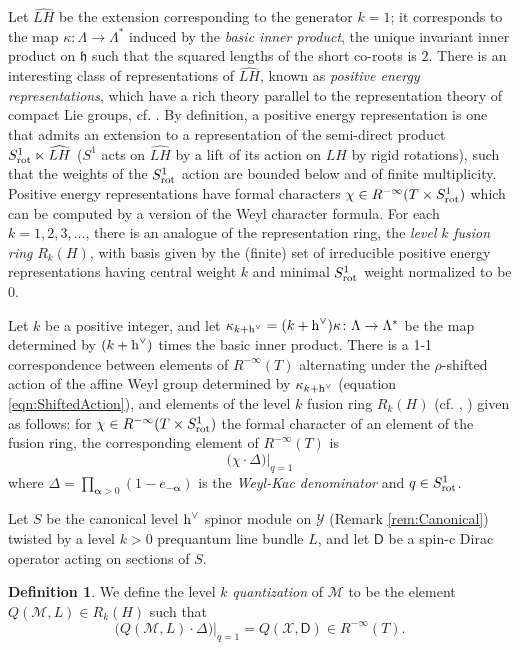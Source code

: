 \documentclass[11pt,reqno]{amsart}
\theoremstyle{definition}
\newtheorem{definition}[theorem]{Definition}
\theoremstyle{remark}
\newcommand{\wh}[1]{\widehat{#1}}
\newcommand{\st}[1]{\mathsf{#1}}
\newcommand{\tn}[1]{\textnormal{#1}}
\def\h{\ensuremath{\mathfrak{h}}}
\def\hvee{\ensuremath{\textnormal{h}^\vee}}
\def\Y{\ensuremath{\mathcal{Y}}}
\def\X{\ensuremath{\mathcal{X}}}
\def\M{\ensuremath{\mathcal{M}}}
\def\rot{\ensuremath{\tn{rot}}}
\begin{document}
Let $\wh{LH}$ be the extension corresponding to the generator $k=1$; it corresponds to the map $\kappa \colon \Lambda \rightarrow \Lambda^\ast$ induced by the \emph{basic inner product}, the unique invariant inner product on $\h$ such that the squared lengths of the short co-roots is $2$.  There is an interesting class of representations of $\wh{LH}$, known as \emph{positive energy representations}, which have a rich theory parallel to the representation theory of compact Lie groups, cf. \cite{KacBook,PressleySegal}.  By definition, a positive energy representation is one that admits an extension to a representation of the semi-direct product $S^1_{\rot}\ltimes \wh{LH}$ ($S^1$ acts on $\wh{LH}$ by a lift of its action on $LH$ by rigid rotations), such that the weights of the $S^1_{\rot}$ action are bounded below and of finite multiplicity.  Positive energy representations have formal characters $\chi \in R^{-\infty}(T\times S^1_{\rot})$ which can be computed by a version of the Weyl character formula.  For each $k=1,2,3,...$, there is an analogue of the representation ring, the \emph{level} $k$ \emph{fusion ring} $R_k(H)$, with basis given by the (finite) set of irreducible positive energy representations having central weight $k$ and minimal $S^1_{\rot}$ weight normalized to be $0$.

Let $k$ be a positive integer, and let $\kappa_{k+\hvee}=(k+\hvee)\kappa \colon \Lambda \rightarrow \Lambda^\ast$ be the map determined by $(k+\hvee)$ times the basic inner product.  There is a 1-1 correspondence between elements of $R^{-\infty}(T)$ alternating under the $\rho$-shifted action of the affine Weyl group determined by $\kappa_{k+\hvee}$ (equation \eqref{eqn:ShiftedAction}), and elements of the level $k$ fusion ring $R_k(H)$ (cf. \cite[Chapter 14]{PressleySegal}, \cite{KacBook,FHTII}) given as follows: for $\chi \in R^{-\infty}(T\times S^1_{\textnormal{rot}})$ the formal character of an element of the fusion ring, the corresponding element of $R^{-\infty}(T)$ is
\[ \big(\chi \cdot \Delta \big)|_{q=1} \]
where $\Delta=\prod_{\bm{\alpha}>0}(1-e_{-\bm{\alpha}})$ is the \emph{Weyl-Kac denominator} and $q \in S^1_{\textnormal{rot}}$.

Let $S$ be the canonical level $\hvee$ spinor module on $\Y$ (Remark \ref{rem:Canonical}) twisted by a level $k>0$ prequantum line bundle $L$, and let $\st{D}$ be a spin-c Dirac operator acting on sections of $S$.
\begin{definition}
\label{def:QuantizeM}
We define the level $k$ \emph{quantization} of $\M$ to be the element $Q(\M,L) \in R_k(H)$ such that
\[ \big(Q(\M,L)\cdot \Delta \big)|_{q=1}=Q(\X, \st{D}) \in R^{-\infty}(T).\]
\end{definition}
\end{document}
